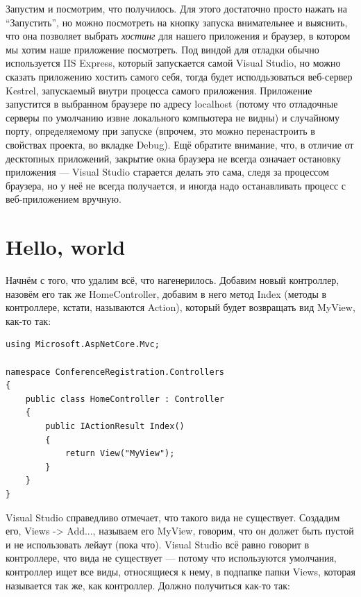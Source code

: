 \documentclass[a5paper]{article}
\begin{document}
Запустим и посмотрим, что получилось. Для этого достаточно просто нажать на ``Запустить'', но можно посмотреть на кнопку запуска внимательнее и выяснить, что она позволяет выбрать \textit{хостинг} для нашего приложения и браузер, в котором мы хотим наше приложение посмотреть.
Под виндой для отладки обычно используется IIS Express, который запускается самой Visual Studio, но можно сказать приложению хостить самого себя, тогда будет исполдьзоваться веб-сервер Kestrel, запускаемый внутри процесса самого приложения. Приложение запустится в выбранном браузере
по адресу localhost (потому что отладочные серверы по умолчанию извне локального компьютера не видны) и случайному порту, определяемому при запуске (впрочем, это можно перенастроить в свойствах проекта, во вкладке Debug). Ещё обратите внимание, что, в отличие от десктопных приложений,
закрытие окна браузера не всегда означает остановку приложения --- Visual Studio старается делать это сама, следя за процессом браузера, но у неё не всегда получается, и иногда надо останавливать процесс с веб-приложением вручную.

\section{Hello, world}

Начнём с того, что удалим всё, что нагенерилось. Добавим новый контроллер, назовём его так же HomeController, добавим в него метод Index (методы в контроллере, кстати, называются Action), который будет возвращать вид MyView, как-то так:

\begin{verbatim}
using Microsoft.AspNetCore.Mvc;

namespace ConferenceRegistration.Controllers
{
    public class HomeController : Controller
    {
        public IActionResult Index()
        {
            return View("MyView");
        }
    }
}
\end{verbatim}

Visual Studio справедливо отмечает, что такого вида не существует. Создадим его, Views -> Add..., называем его MyView, говорим, что он должет быть пустой и не использовать лейаут (пока что). Visual Studio всё равно говорит в контроллере, что вида не существует ---
потому что используются умолчания, контроллер ищет все виды, относящиеся к нему, в подпапке папки Views, которая называется так же, как контроллер. Должно получиться как-то так:
\end{document}
